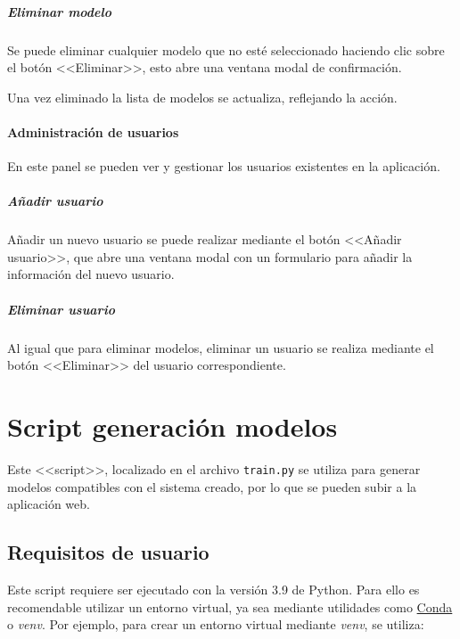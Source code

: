 
\subparagraph{Eliminar modelo}

Se puede eliminar cualquier modelo que no esté seleccionado haciendo clic sobre
el botón <<Eliminar>>, esto abre una ventana modal de confirmación.


Una vez eliminado la lista de modelos se actualiza, reflejando la acción.

\paragraph{Administración de usuarios}

En este panel se pueden ver y gestionar los usuarios existentes en la
aplicación.

\subparagraph{Añadir usuario}

Añadir un nuevo usuario se puede realizar mediante el botón <<Añadir usuario>>,
que abre una ventana modal con un formulario para añadir la información del
nuevo usuario.


\subparagraph{Eliminar usuario}

Al igual que para eliminar modelos, eliminar un usuario se realiza mediante el
botón <<Eliminar>> del usuario correspondiente.


\section{Script generación modelos}

Este <<script>>, localizado en el archivo \texttt{train.py} se utiliza para
generar modelos compatibles con el sistema creado, por lo que se pueden subir a
la aplicación web.

\subsection{Requisitos de usuario}

Este script requiere ser ejecutado con la versión 3.9 de Python. Para ello es
recomendable utilizar un entorno virtual, ya sea mediante utilidades como
\href{https://docs.conda.io/en/latest/}{Conda} o \textit{venv}. Por
ejemplo, para crear un entorno virtual mediante \textit{venv}, se utiliza:

